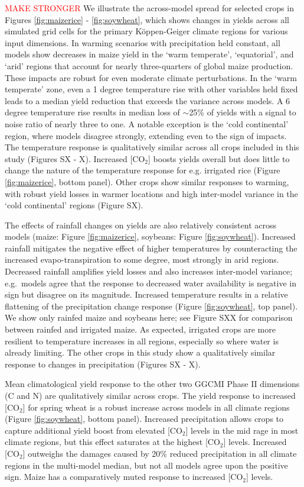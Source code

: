 \documentclass[gmd, manuscript]{copernicus} %
\begin{document}
\textcolor{red}{MAKE STRONGER} We illustrate the across-model spread for selected crops in Figures \ref{fig:maizerice} - \ref{fig:soywheat}, which shows changes in yields across all simulated grid cells for the primary K\"{o}ppen-Geiger climate regions \citep{rubel2010} for various input dimensions.
In warming scenarios with precipitation held constant, all models show decreases in maize yield in the `warm temperate', `equatorial', and `arid' regions that account for nearly three-quarters of global maize production. 
These impacts are robust for even moderate climate perturbations.
In the `warm temperate' zone, even a 1 degree temperature rise with other variables held fixed leads to a median yield reduction that exceeds the variance across models. 
A 6 degree temperature rise results in median loss of $\sim$25\% of yields with a signal to noise ratio of nearly three to one. A notable exception is the `cold continental' region, where models disagree strongly, extending even to the sign of impacts. 
The temperature response is qualitatively similar across all crops included in this study (Figures SX - X).
Increased [CO$_2$] boosts yields overall but does little to change the nature of the temperature response for e.g. irrigated rice (Figure \ref{fig:maizerice}, bottom panel).
Other crops show similar responses to warming, with robust yield losses in warmer locations and high inter-model variance in the `cold continental' regions (Figure SX).

The effects of rainfall changes on yields are also relatively consistent across models (maize: Figure \ref{fig:maizerice}, soybeans: Figure \ref{fig:soywheat}). 
Increased rainfall mitigates the negative effect of higher temperatures by counteracting the increased evapo-transpiration to some degree, most strongly in arid regions.
Decreased rainfall amplifies yield losses and also increases inter-model variance; e.g.\ models agree that the response to decreased water availability is negative in sign but disagree on its magnitude.
Increased temperature results in a relative flattening of the precipitation change response (Figure \ref{fig:soywheat}, top panel).
We show only rainfed maize and soybeans here; see Figure SXX for comparison between rainfed and irrigated maize. 
As expected, irrigated crops are more resilient to temperature increases in all regions, especially so where water is already limiting. 
The other crops in this study show a qualitatively similar response to changes in precipitation (Figures SX - X).

Mean climatological yield response to the other two GGCMI Phase II dimensions (C and N) are qualitatively similar across crops. 
The yield response to increased [CO$_2$] for spring wheat is a robust increase across models in all climate regions (Figure \ref{fig:soywheat}, bottom panel). 
Increased precipitation allows crops to capture additional yield boost from elevated [CO$_2$] levels in the mid rage in most climate regions, but this effect saturates at the highest [CO$_2$] levels. 
Increased [CO$_2$] outweighs the damages caused by 20\% reduced precipitation in all climate regions in the multi-model median, but not all models agree upon the positive sign.
Maize has a comparatively muted response to increased [CO$_2$] levels. 
\end{document}

